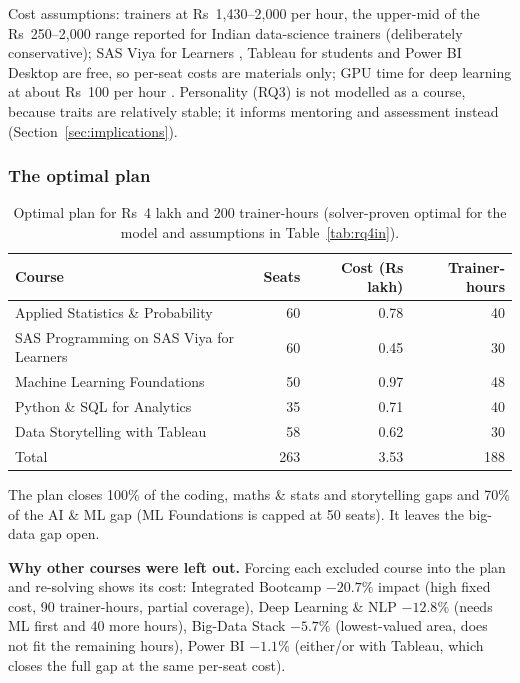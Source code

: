 Cost assumptions: trainers at Rs~1,430--2,000 per hour, the upper-mid of the Rs~250--2,000 range
reported for Indian data-science trainers \citep{knowledgehut} (deliberately conservative); SAS
Viya for Learners \citep{sasvfl}, Tableau for students and Power BI Desktop are free, so per-seat
costs are materials only; GPU time for deep learning at about Rs~100 per hour \citep{gpuindia2026}.
Personality (RQ3) is not modelled as a course, because traits are relatively stable; it informs
mentoring and assessment instead (Section~\ref{sec:implications}).

\subsubsection{The optimal plan}

\begin{table}[H]\centering\small
\caption{Optimal plan for Rs~4 lakh and 200 trainer-hours (solver-proven optimal for the model and assumptions in Table~\ref{tab:rq4in}).}\label{tab:plan}
\begin{tabular}{@{}l r r r@{}}
\toprule
Course & Seats & Cost (Rs lakh) & Trainer-hours\\
\midrule
Applied Statistics \& Probability & 60 & 0.78 & 40\\
SAS Programming on SAS Viya for Learners & 60 & 0.45 & 30\\
Machine Learning Foundations & 50 & 0.97 & 48\\
Python \& SQL for Analytics & 35 & 0.71 & 40\\
Data Storytelling with Tableau & 58 & 0.62 & 30\\
\midrule
Total & 263 & 3.53 & 188\\
\bottomrule
\end{tabular}
\end{table}


The plan closes 100\% of the coding, maths \& stats and storytelling gaps and 70\% of the AI \& ML
gap (ML Foundations is capped at 50 seats). It leaves the big-data gap open.

\textbf{Why other courses were left out.} Forcing each excluded course into the plan and re-solving
shows its cost: Integrated Bootcamp $-20.7\%$ impact (high fixed cost, 90 trainer-hours, partial
coverage), Deep Learning \& NLP $-12.8\%$ (needs ML first and 40 more hours), Big-Data Stack $-5.7\%$
(lowest-valued area, does not fit the remaining hours), Power BI $-1.1\%$ (either/or with Tableau,
which closes the full gap at the same per-seat cost).


